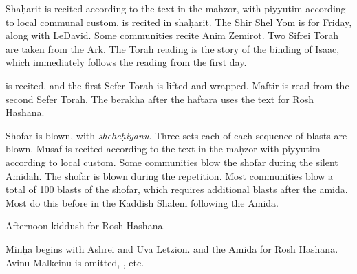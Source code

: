 {Sha\d{h}arit is recited according to the text in the ma\d{h}zor, with piyyutim according to local communal custom.  is recited in sha\d{h}arit. The Shir Shel Yom is for Friday, along with LeDavid.  Some communities recite Anim Zemirot.  Two Sifrei Torah are taken from the Ark.  The Torah reading is the story of the binding of Isaac, which immediately follows the reading from the first day.

\leinRoshHashanaII

\halfkad is recited, and the first Sefer Torah is lifted and wrapped. Maftir is read from the second Sefer Torah. \haftRoshHashanaII The berakha after the haftara uses the text for Rosh Hashana.

Shofar is blown, with \textit{shehe\d{h}iyanu}. Three sets each of each sequence of blasts are blown.  Musaf is recited according to the text in the ma\d{h}zor with piyyutim according to local custom. Some communities blow the shofar during the silent Amidah.  The shofar is blown during the repetition.  Most communities blow a total of 100 blasts of the shofar, which requires additional blasts after the amida.  Most do this before  in the Kaddish Shalem following the Amida.

Afternoon kiddush for Rosh Hashana.

Min\d{h}a begins with Ashrei and Uva Letzion. \halfkad and the Amida for Rosh Hashana. Avinu Malkeinu is omitted, \fullkad , etc.
}

\newcommand{\tzomGedalia}[3]{
\textbf{Tzom Gedalia \textendash\space #3 Tishrei}

The Third of Tishrei is a minor fast, commemoratting the assassination of Gedalia, the governor of the Babylonian province of Judea.  His assassination ended the last Jewish governance that had remained after the destruction of the First Temple. It also is part of the fasting of the Yamim Noraim season, which formerly included days of fasting. #2

Seli\d{h}ot are recited (before sha\d{h}arit, as during the 10 Days of Repentence). Additions to the Amidah for both minor fasts and the 10 Days of Repentence are included. Avinu Malkeinu is read, using the text for the 10 Days of Repentence.

\leinminorfast

Psalm of the day for #1 and Ledavid.

Min\d{h}a is said with the same Torah reading as sha\d{h}arit, except that the third aliya is called as Maftir. \haftTzomMincha The Amidah is recited, with additions for the Ten Days of Repentence and minor fasts. Avinu Malkeinu is recited, with the text for the 10 Days of Repentence.
}


